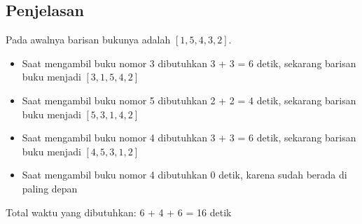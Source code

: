 \documentclass{article}
\begin{document}
\subsection*{Penjelasan}
Pada awalnya barisan bukunya adalah $\left[1,5,4,3,2\right]$.
\begin{itemize}
\item{Saat mengambil buku nomor 3 dibutuhkan 3 + 3 = 6 detik, sekarang barisan buku menjadi $\left[3,1,5,4,2\right]$}
\item{Saat mengambil buku nomor 5 dibutuhkan 2 + 2 = 4 detik, sekarang barisan buku menjadi $\left[5,3,1,4,2\right]$}
\item{Saat mengambil buku nomor 4 dibutuhkan 3 + 3 = 6 detik, sekarang barisan buku menjadi $\left[4,5,3,1,2\right]$}
\item{Saat mengambil buku nomor 4 dibutuhkan 0 detik, karena sudah berada di paling depan}
\end{itemize}
Total waktu yang dibutuhkan: 6 + 4 + 6 = 16 detik
\end{document}

